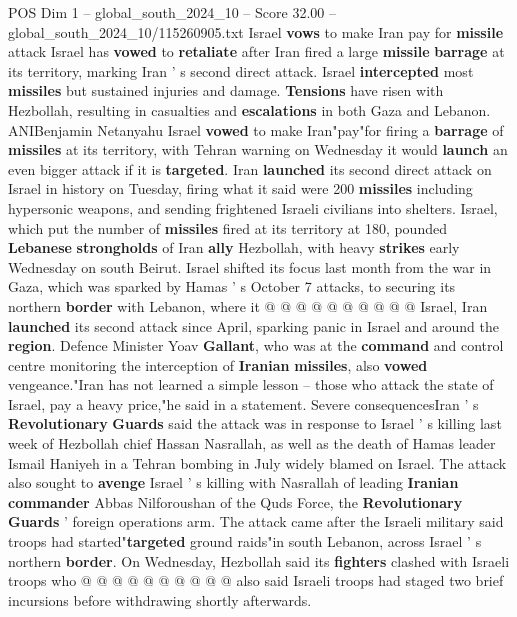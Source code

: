 \begin{textsample}{POS Dim 1 – global\_south\_2024\_10 – Score 32.00 – global\_south\_2024\_10/115260905.txt}  \label{ex:f1_pos_026}
Israel \textbf{vows} to make Iran pay for \textbf{missile} attack Israel has \textbf{vowed} to \textbf{retaliate} after Iran fired a large \textbf{missile} \textbf{barrage} at its territory, marking Iran ' s second direct attack.
Israel \textbf{intercepted} most \textbf{missiles} but sustained injuries and damage. \textbf{Tensions} have risen with Hezbollah, resulting in casualties and \textbf{escalations} in both Gaza and Lebanon.
ANIBenjamin Netanyahu Israel \textbf{vowed} to make Iran"pay"for firing a \textbf{barrage} of \textbf{missiles} at its territory, with Tehran warning on Wednesday it would \textbf{launch} an even bigger attack if it is \textbf{targeted}.
Iran \textbf{launched} its second direct attack on Israel in history on Tuesday, firing what it said were 200 \textbf{missiles} including hypersonic weapons, and sending frightened Israeli civilians into shelters.
Israel, which put the number of \textbf{missiles} fired at its territory at 180, pounded \textbf{Lebanese} \textbf{strongholds} of Iran \textbf{ally} Hezbollah, with heavy \textbf{strikes} early Wednesday on south Beirut.
Israel shifted its focus last month from the war in Gaza, which was sparked by Hamas ' s October 7 attacks, to securing its northern \textbf{border} with Lebanon, where it @ @ @ @ @ @ @ @ @ @ Israel, Iran \textbf{launched} its second attack since April, sparking panic in Israel and around the \textbf{region}.
Defence Minister Yoav \textbf{Gallant}, who was at the \textbf{command} and control centre monitoring the interception of \textbf{Iranian} \textbf{missiles}, also \textbf{vowed} vengeance."Iran has not learned a simple lesson -- those who attack the state of Israel, pay a heavy price,"he said in a statement.
Severe consequencesIran ' s \textbf{Revolutionary} \textbf{Guards} said the attack was in response to Israel ' s killing last week of Hezbollah chief Hassan Nasrallah, as well as the death of Hamas leader Ismail Haniyeh in a Tehran bombing in July widely blamed on Israel.
The attack also sought to \textbf{avenge} Israel ' s killing with Nasrallah of leading \textbf{Iranian} \textbf{commander} Abbas Nilforoushan of the Quds Force, the \textbf{Revolutionary} \textbf{Guards} ' foreign operations arm.
The attack came after the Israeli military said troops had started"\textbf{targeted} ground raids"in south Lebanon, across Israel ' s northern \textbf{border}.
On Wednesday, Hezbollah said its \textbf{fighters} clashed with Israeli troops who @ @ @ @ @ @ @ @ @ @ also said Israeli troops had staged two brief incursions before withdrawing shortly afterwards.

\end{textsample}
